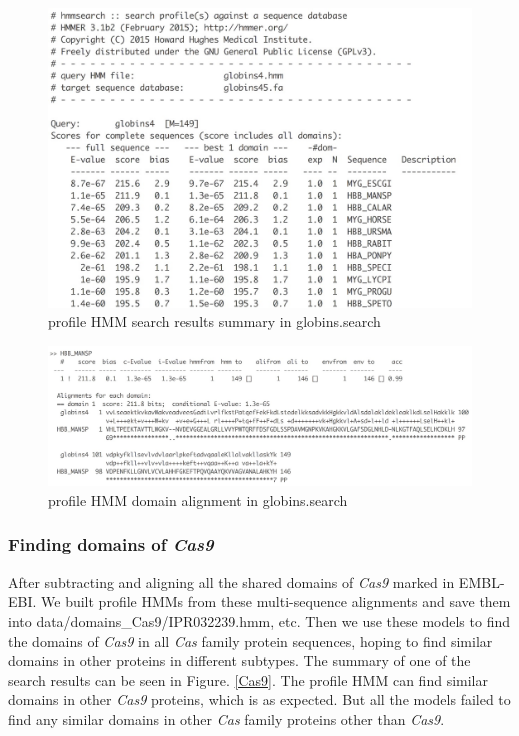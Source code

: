 \documentclass[11pt, oneside]{article}
\begin{document}
\begin{figure}[ht]
  \centering
  \includegraphics[scale = 0.35]{images/hmm_test1}
      \caption{profile HMM search results summary in globins.search}
      \label{hmm_test1}
\end{figure} 

\begin{figure}[ht]
  \centering
  \includegraphics[scale = 0.3]{images/hmm_test2}
      \caption{profile HMM domain alignment in globins.search}
      \label{hmm_test2}
\end{figure} 


\subsubsection{Finding domains of \textit{Cas9}}

After subtracting and aligning all the shared domains of \textit{Cas9} marked in EMBL-EBI. We built profile HMMs from these multi-sequence alignments and save them into data/domains\_Cas9/IPR032239.hmm, etc. Then we use these models to find the domains of \textit{Cas9} in all \textit{Cas} family protein sequences, hoping to find similar domains in other proteins in different subtypes. The summary of one of the search results can be seen in Figure. \ref{Cas9}. The profile HMM can find similar domains in other \textit{Cas9} proteins, which is as expected. But all the models failed to find any similar domains in other \textit{Cas} family proteins other than \textit{Cas9}.
\end{document}
